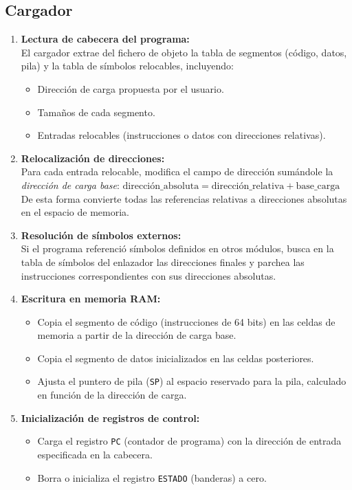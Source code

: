 \documentclass{article}
\begin{document}
\subsection{Cargador}

\begin{enumerate}
\item \textbf{Lectura de cabecera del programa:}\\
El cargador extrae del fichero de objeto la tabla de segmentos (código, datos, pila) y la tabla de símbolos relocables, incluyendo:
\begin{itemize}
\item Dirección de carga propuesta por el usuario.
\item Tamaños de cada segmento.
\item Entradas relocables (instrucciones o datos con direcciones relativas).
\end{itemize}

\item \textbf{Relocalización de direcciones:}\\
Para cada entrada relocable, modifica el campo de dirección sumándole la \emph{dirección de carga base}:
$       \text{dirección\_absoluta} = \text{dirección\_relativa} + \text{base\_carga}
    $
De esta forma convierte todas las referencias relativas a direcciones absolutas en el espacio de memoria.

\item \textbf{Resolución de símbolos externos:}\\
Si el programa referenció símbolos definidos en otros módulos, busca en la tabla de símbolos del enlazador las direcciones finales y parchea las instrucciones correspondientes con sus direcciones absolutas.

\item \textbf{Escritura en memoria RAM:}\\
\begin{itemize}
\item Copia el segmento de código (instrucciones de 64 bits) en las celdas de memoria a partir de la dirección de carga base.
\item Copia el segmento de datos inicializados en las celdas posteriores.
\item Ajusta el puntero de pila (\texttt{SP}) al espacio reservado para la pila, calculado en función de la dirección de carga.
\end{itemize}

\item \textbf{Inicialización de registros de control:}\\
\begin{itemize}
\item Carga el registro \texttt{PC} (contador de programa) con la dirección de entrada especificada en la cabecera.
\item Borra o inicializa el registro \texttt{ESTADO} (banderas) a cero.
\end{itemize}


\end{enumerate}
\end{document}
